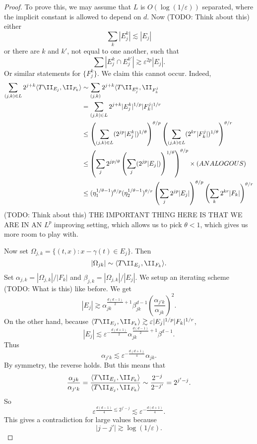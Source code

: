 \begin{proof}
    To prove this, we may assume that $L$ is $O( \log (1/\varepsilon) )$ separated, where the implicit constant is allowed to depend on $d$. Now (TODO: Think about this) either
    \[ \sum_k |E_j^k| \lesssim |E_j| \]
    or there are $k$ and $k'$, not equal to one another, such that
    \[ \sum |E_j^k \cap E_j^{k'}| \gtrsim \varepsilon^{2p} |E_j|. \]
    Or similar statements for $\{ F_j^k \}$. We claim this cannot occur. Indeed,
    \begin{align*}
        \sum_{(j,k) \in L} 2^{j+k} \langle T \II_{E_j}, \II_{F_k} \rangle &\sim \sum_{(j,k)} 2^{j+k} \langle T \II_{E_j^k}, \II_{F^j_k}\\
        &= \sum_{(j,k) \in L} 2^{j+k} |E_j^k|^{1/p} |F_k^j|^{1/r}\\
        &\leq \left( \sum_{(j,k) \in L} (2^{jp} |E_j^k|)^{1/\theta} \right)^{\theta/p} \left( \sum_{(j,k) \in L} (2^{kr} |F_k^j|)^{1/\theta} \right)^{\theta/r}\\
        &\leq \left( \sum_j 2^{jp/\theta} \left( \sum_j ( 2^{jp} |E_j| ) \right)^{1/\theta} \right)^{\theta / p} \times (ANALOGOUS)\\
        &\leq (\eta_1^{1/\theta - 1})^{\theta/p} (\eta_2^{1/\theta - 1})^{\theta/r} \left( \sum_j 2^{jp} |E_j| \right)^{\theta/p} \left( \sum_k 2^{kr} |F_k| \right)^{\theta/r}
    \end{align*}
    (TODO: Think about this) THE IMPORTANT THING HERE IS THAT WE ARE IN AN $L^p$ improving setting, which allows us to pick $\theta < 1$, which gives us more room to play with.

    Now set $\Omega_{j,k} = \{ (t,x) : x - \gamma(t) \in E_j \}$. Then
    \[ |\Omega_{jk}| \sim \langle T \II_{E_j}, \II_{F_k} \rangle. \]
    Set $\alpha_{j,k} = |\Omega_{j,k}| / |F_k|$ and $\beta_{j,k} = |\Omega_{j,k}| / |E_j|$. We setup an iterating scheme (TODO: What is this) like before. We get
    \[ |E_j| \gtrsim \alpha_{jk}^{\frac{d(d-1)}{2} + 1} \beta_{jk}^{d-1} \left( \frac{\alpha_{j'k}}{\alpha_{jk}} \right)^2. \]
    On the other hand, because $\langle T \II_{E_j}, \II_{F_k} \rangle \gtrsim \varepsilon |E_j|^{1/p} |F_k|^{1/r}$,
    \[ |E_j| \lesssim \varepsilon^{- \frac{d(d+1)}{2}} \alpha_{jk}^{\frac{d(d-1)}{2} + 1} \beta^{d-1}. \]
    Thus
    \[ \alpha_{j'k} \lesssim \varepsilon^{- \frac{d(d+1)}{4}} \alpha_{jk}. \]
    By symmetry, the reverse holds. But this means that
    \[ \frac{\alpha_{jk}}{\alpha_{j'k}} = \frac{\langle T \II_{E_j}, \II_{F_k} \rangle}{\langle T \II_{E_j}, \II_{F_k} \rangle} \sim \frac{2^{-j}}{2^{-j'}} = 2^{j' - j}. \]
    So
    \[ \varepsilon^{\frac{d(d-1)}{4} \lesssim 2^{j' - j}} \lesssim \varepsilon^{- \frac{d(d+1)}{4}}. \]
    This gives a contradiction for large values because
    \[ |j - j'| \gtrsim \log (1/\varepsilon). \]
\end{proof}

